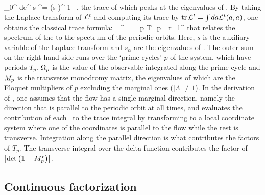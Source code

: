 \beq
	\int_0^{\infty} d\zeit e^{-s\zeit} \Lop^\zeit = (s-\Aop)^{-1} \, ,
	\label{eq-ResolventA}
\eeq
the trace of which peaks at the eigenvalues of \Aop. By taking the
Laplace transform of ${\cal L}^{t}$ and computing its trace
by $\mbox{\rm tr}\, {\cal L}^{t} = \int da {\cal L}^{t} (a,a)$, one obtains the
classical trace formula:
\beq
\sum_{}^{\infty}  = \sum_p T_p
\sum_{r=1}^{\infty}  
that relates the spectrum of the {\evOper} to the spectrum of the periodic
orbits. Here,  $s$ is the auxiliary
variable of the Laplace transform and $s_{\alpha}$ are the eigenvalues of \Aop . The
outer sum on the right hand side runs over the `prime cycles' $p$ of the system,
which have periods $T_p$. $\Omega_p$ is the value of
the observable integrated along the prime cycle and $M_p$ is the transverse
monodromy matrix, the eigenvalues of which are the Floquet multipliers of $p$ 
excluding the marginal ones ($|\Lambda| \neq 1$). In the derivation of 
, one assumes that the flow has a single marginal direction, 
namely the direction that is parallel to the periodic orbit at all times, and evaluates the 
contribution of each \po\ to the trace integral by transforming to a local coordinate 
system where one of the coordinates is 
parallel to the flow while the rest is transverse. Integration along the 
parallel direction is what contributes the factors of $T_p$. The transverse integral 
over the delta function contributes the factor of $\left|\mbox{\rm det}\,\!\left({\bf 1}-M_p^{r}\right)\right|$. 

\subsection{Continuous factorization}
\label{s-ContFac}

